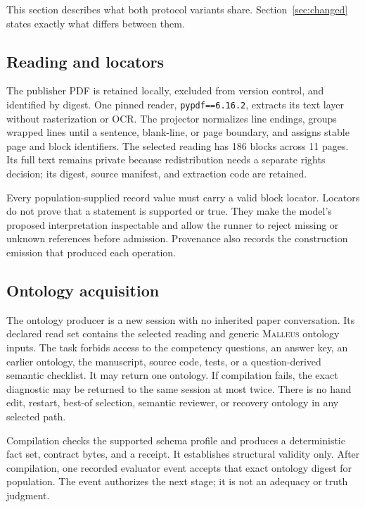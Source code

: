 \documentclass[10pt]{article}
\newcommand{\malleus}{\textsc{Malleus}}
\newcommand{\code}[1]{\texttt{#1}}
\begin{document}
This section describes what both protocol variants share. Section~\ref{sec:changed} states exactly what differs between them.

\subsection{Reading and locators}

The publisher PDF is retained locally, excluded from version control, and identified by digest. One pinned reader, \code{pypdf==6.16.2}, extracts its text layer without rasterization or OCR. The projector normalizes line endings, groups wrapped lines until a sentence, blank-line, or page boundary, and assigns stable page and block identifiers. The selected reading has 186 blocks across 11 pages. Its full text remains private because redistribution needs a separate rights decision; its digest, source manifest, and extraction code are retained.

Every population-supplied record value must carry a valid block locator. Locators do not prove that a statement is supported or true. They make the model's proposed interpretation inspectable and allow the runner to reject missing or unknown references before admission. Provenance also records the construction emission that produced each operation.

\subsection{Ontology acquisition}

The ontology producer is a new session with no inherited paper conversation. Its declared read set contains the selected reading and generic \malleus{} ontology inputs. The task forbids access to the competency questions, an answer key, an earlier ontology, the manuscript, source code, tests, or a question-derived semantic checklist. It may return one ontology. If compilation fails, the exact diagnostic may be returned to the same session at most twice. There is no hand edit, restart, best-of selection, semantic reviewer, or recovery ontology in any selected path.

Compilation checks the supported schema profile and produces a deterministic fact set, contract bytes, and a receipt. It establishes structural validity only. After compilation, one recorded evaluator event accepts that exact ontology digest for population. The event authorizes the next stage; it is not an adequacy or truth judgment.
\end{document}
